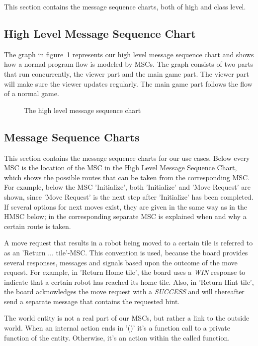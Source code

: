 This section contains the message sequence charts, both of high and class level.
\subsection{High Level Message Sequence Chart}
	The graph in figure~\ref{fig:msc:high} represents our high level message sequence chart and shows how a normal program flow is modeled by MSCs. The graph consists of two parts that run concurrently, the viewer part and the main game part. The viewer part will make sure the viewer updates regularly. The main game part follows the flow of a normal game.
	
	\begin{figure}[h]
		
		\label{fig:msc:high}
		\caption{The high level message sequence chart}
	\end{figure}

\subsection{Message Sequence Charts}
	This section contains the message sequence charts for our use cases. Below every MSC is the location of the MSC in the High Level Message Sequence Chart, which shows the possible routes that can be taken from the corresponding MSC. For example, below the MSC 'Initialize', both 'Initialize' and 'Move Request' are shown, since 'Move Request' is the next step after 'Initialize' has been completed. If several options for next moves exist, they are given in the same way as in the HMSC below; in the corresponding separate MSC is explained when and why a certain route is taken.

    A move request that results in a robot being moved to a certain tile is referred to as an 'Return ... tile'-MSC. This convention is used, because the board provides several responses, messages and signals based upon the outcome of the move request. For example, in 'Return Home tile', the board uses a \emph{WIN} response to indicate that a certain robot has reached its home tile. Also, in 'Return Hint tile', the board acknowledges the move request with a \emph{SUCCESS} and will thereafter send a separate message that contains the requested hint.

	The world entity is not a real part of our MSCs, but rather a link to the outside world. When an internal action ends in '()' it's a function call to a private function of the entity. Otherwise, it's an action within the called function.

